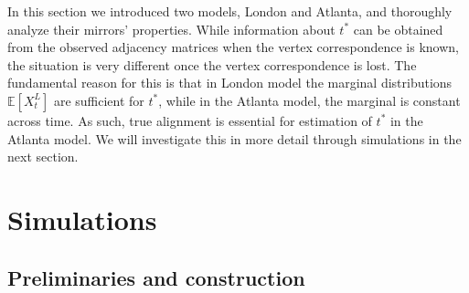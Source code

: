\documentclass[12pt]{article}
\newcommand{\EE}{\mathbb{E}}
\theoremstyle{definition}
\begin{document}
In this section we introduced two models, London and Atlanta, and thoroughly analyze their mirrors' properties.
While information about $t^*$ can be obtained from the observed adjacency matrices when the vertex correspondence is known, the situation is very different once the vertex correspondence is lost. The fundamental reason for this is that in London model the marginal distributions $\EE[X^L_t]$ are sufficient for $t^*$, while in the Atlanta model, the marginal is constant across time. As such, true alignment is essential for estimation of $t^*$ in the Atlanta model. We will investigate this in more detail through simulations in the next section.


\section{Simulations}\label{sec:Simulations}
\subsection{Preliminaries and construction}\label{sec:Simulation_Preliminaries}
\end{document}
